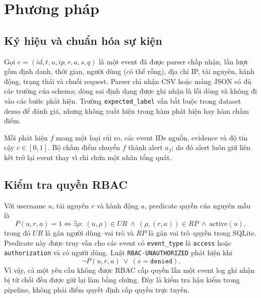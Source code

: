 \section{Phương pháp}
\label{sec:methodology}

\subsection{Ký hiệu và chuẩn hóa sự kiện}
\label{subsec:event-normalization}

Gọi $e=(id,t,u,ip,r,a,s,q)$ là một event đã được parser chấp nhận, lần lượt
gồm định danh, thời gian, người dùng (có thể rỗng), địa chỉ IP, tài nguyên,
hành động, trạng thái và chuỗi request. Parser chỉ nhận CSV hoặc mảng JSON có
đủ các trường của schema; dòng sai định dạng được ghi nhận là lỗi dòng và không
đi vào các bước phát hiện. Trường \texttt{expected\_label} vẫn bắt buộc trong
dataset demo để đánh giá, nhưng không xuất hiện trong hàm phát hiện hay hàm
chấm điểm.

Mỗi phát hiện $f$ mang một loại rủi ro, các event IDs nguồn, evidence và độ tin
cậy $c\in[0,1]$. Bộ chấm điểm chuyển $f$ thành alert $a_f$; do đó alert luôn
giữ liên kết trở lại event thay vì chỉ chứa một nhãn tổng quát.

\subsection{Kiểm tra quyền RBAC}
\label{subsec:rbac-checking}

Với username $u$, tài nguyên $r$ và hành động $a$, predicate quyền của nguyên
mẫu là
\begin{equation}
  P(u,r,a)=1 \Longleftrightarrow \exists \rho:\ (u,\rho)\in UR
  \ \land\ (\rho,(r,a))\in RP\ \land\ \mathrm{active}(u),
  \label{eq:rbac-permission}
\end{equation}
trong đó $UR$ là gán người dùng--vai trò và $RP$ là gán vai trò--quyền trong
SQLite. Predicate này được truy vấn cho các event có \texttt{event\_type} là
\texttt{access} hoặc \texttt{authorization} và có người dùng. Luật
\texttt{RBAC-UNAUTHORIZED} phát hiện khi
\begin{equation}
  \neg P(u,r,a)\ \lor\ (s=\texttt{denied}).
  \label{eq:unauthorized-rule}
\end{equation}
Vì vậy, cả một yêu cầu không được RBAC cấp quyền lẫn một event log ghi nhận bị
từ chối đều được giữ lại làm bằng chứng. Đây là kiểm tra hậu kiểm trong pipeline,
không phải điểm quyết định cấp quyền trực tuyến.

